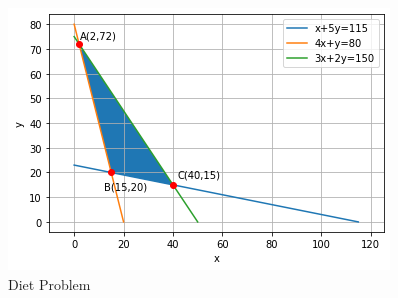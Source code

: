     \begin{figure}[!ht]
    \centering
    \includegraphics[width=\columnwidth]{solutions/su2021/2/36/Figure12.png}
    \caption{Diet Problem}
    \label{opt/36/fig:diet problem}	
    \end{figure}